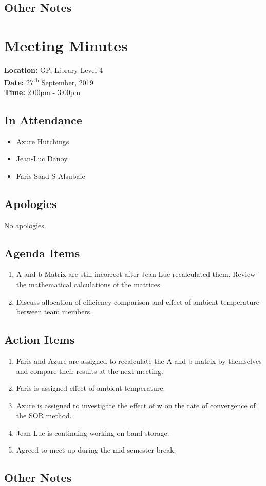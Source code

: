 \documentclass{article}
\begin{document}
\subsection*{Other Notes}

\pagebreak

\section{Meeting Minutes}
\textbf{Location:} GP, Library Level 4 \\
\textbf{Date:} 27\textsuperscript{th} September, 2019 \\
\textbf{Time:} 2:00pm - 3:00pm

\subsection*{In Attendance}
\begin{itemize}
\item Azure Hutchings
\item Jean-Luc Danoy
\item Faris Saad S Alsubaie
\end{itemize}

\subsection*{Apologies}
No apologies. 

\subsection*{Agenda Items}
\begin{enumerate}
\item A and b Matrix are still incorrect after Jean-Luc recalculated them. Review the mathematical calculations of the matrices.
\item Discuss allocation of efficiency comparison and effect of ambient temperature between team members. 
\ 
\end{enumerate}

\subsection*{Action Items}
\begin{enumerate}
\item Faris and Azure are assigned to recalculate the A and b matrix by themselves and compare their results at the next meeting.
\item Faris is assigned effect of ambient temperature.
\item Azure is assigned to investigate the effect of w on the rate of convergence of the SOR method.
\item Jean-Luc is continuing working on band storage.
\item Agreed to meet up during the mid semester break.
\end{enumerate}

\subsection*{Other Notes}

\pagebreak
\end{document}
